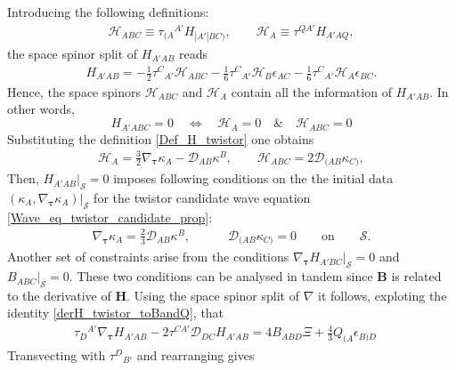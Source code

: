 \documentclass[10pt,a4paper]{article}
\theoremstyle{plain}
\def\bmB{{\bm B}}
\def\bmH{{\bm H}}
\begin{document}
\medskip

Introducing the following definitions:
\begin{align}
  \mathcal{H} _{ABC}  \equiv \tau _{(A}{}^{A'}H_{|A'|BC)}, \qquad
  \mathcal{H}_{A}  \equiv  \tau^{QA'} H_{A'AQ},
\end{align}
the space spinor split of $H_{A'AB}$ reads
\begin{align}
  H_{A'AB} = - \tfrac{1}{2} \tau ^{C}{}_{A'} \mathcal{H} _{ABC}  -
  \tfrac{1}{6} \tau ^{C}{}_{A'} \mathcal{H} _{B} \epsilon _{AC}  -
  \tfrac{1}{6} \tau ^{C}{}_{A'} \mathcal{H} _{A} \epsilon _{BC}.
\end{align}
Hence, the space spinors $\mathcal{H} _{ABC}$ and $\mathcal{H}_{A}$
contain all the information of $H_{A'AB}$. In other words,
\[
H_{A'ABC}=0 \quad                   %
\iff \quad \mathcal{H} _{A}=0      %
\quad
\& \quad \mathcal{H}_{ABC}=0  %
\]
Substituting the definition \eqref{Def_H_twistor} one obtains
\begin{align}\label{spacespinordecompHtotwistorders}
\mathcal{H} _{A} = \tfrac{3}{2} \nabla_{\bm\tau} \kappa_{A} - \mathcal{D} _{AB}\kappa^{B}, \qquad \mathcal{H} _{ABC} = 2 \mathcal{D} _{(AB}\kappa _{C)},
\end{align}
Then, $H_{A'AB}|_{\mathcal{S}}=0$  imposes
following conditions on the
the initial data
$(\kappa_A,\nabla_{\bm\tau}\kappa_A)|_{\mathcal{S}}$
for the twistor candidate wave equation
\eqref{Wave_eq_twistor_candidate_prop}:
\begin{align}\label{H_twistor_vanishes_ID}
 \nabla_{\bm\tau} \kappa _{A} = \tfrac{2}{3} \mathcal{D} _{AB}\kappa ^{B}, \qquad
 \quad \mathcal{D} _{(AB}\kappa _{C)}=0 \qquad \text{on} \qquad \mathcal{S}.
\end{align}
Another set of constraints arise from the conditions $\nabla_{\bm\tau}
H_{A'BC}|_{\mathcal{S}}=0$ and $B_{ABC}|_{\mathcal{S}}=0$. These two
conditions can be analysed in tandem since $\bmB$ is related to the
derivative of $\bmH$. Using the space spinor split of $\nabla$ it
follows, exploting the identity \eqref{derH_twistor_toBandQ}, that
\begin{align}
  \tau _{D}{}^{A'}\nabla_{\bm\tau} H_{A'AB} -2 \tau ^{CA'} \mathcal{D}
  _{DC}H_{A'AB} = 4 B_{ABD} \Xi + \tfrac{4}{3} Q_{(A}\epsilon
  _{B)D}\quad
\end{align}
Transvecting with $\tau^{D}{}_{B'}$ and rearranging gives
\end{document}

